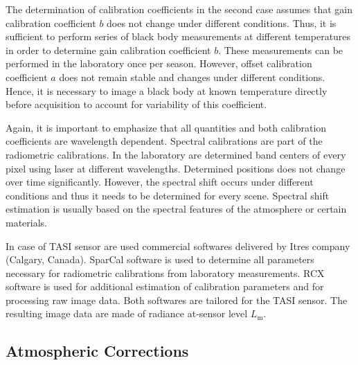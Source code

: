 The determination of calibration coefficients in the second case assumes that gain calibration coefficient $b$ does not change under different conditions. Thus, it is sufficient to perform series of black body measurements at different temperatures in order to determine gain calibration coefficient $b$. These measurements can be performed in the laboratory once per season. However, offset calibration coefficient $a$ does not remain stable and changes under different conditions. Hence, it is necessary to image a black body at known temperature directly before acquisition to account for variability of this coefficient.


Again, it is important to emphasize that all quantities and both calibration coefficients are wavelength dependent. Spectral calibrations are part of the radiometric calibrations. In the laboratory are determined band centers of every pixel using laser at different wavelengths. Determined positions does not change over time significantly. However, the spectral shift occurs under different conditions and thus it needs to be determined for every scene. Spectral shift estimation is usually based on the spectral features of the atmosphere or certain materials.

In case of TASI sensor are used commercial softwares delivered by Itres company (Calgary, Canada). SparCal software \cite{software:SparCal} is used to determine all parameters necessary for radiometric calibrations from laboratory measurements. RCX software \cite{software:RCX} is used for additional  estimation of calibration parameters and for processing raw image data. Both softwares are tailored for the TASI sensor. The resulting image data are made of radiance at-sensor level $L_\mathrm{m}$.

\subsection*{Atmospheric Corrections}

